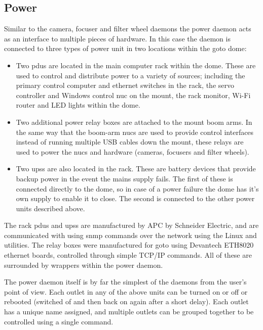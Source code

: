 \begin{colsection}
\begin{colsection}
\end{colsection}


\subsection{Power}
\label{sec:power}
\begin{colsection}

Similar to the camera, focuser and filter wheel daemons the power daemon acts as an interface to multiple pieces of hardware. In this case the daemon is connected to three types of power unit in two locations within the \gls{goto} dome:

\begin{itemize}
    \item Two \glspl{pdu} are located in the main computer rack within the dome. These are used to control and distribute power to a variety of sources; including the primary control computer and ethernet switches in the rack, the servo controller and Windows control \gls{nuc} on the mount, the rack monitor, Wi-Fi router and LED lights within the dome.
    \item Two additional power relay boxes are attached to the mount boom arms. In the same way that the boom-arm \glspl{nuc} are used to provide control interfaces instead of running multiple USB cables down the mount, these relays are used to power the \glspl{nuc} and hardware (cameras, focusers and filter wheels).
    \item Two \glspl{ups} are also located in the rack. These are battery devices that provide backup power in the event the mains supply fails. The first of these is connected directly to the dome, so in case of a power failure the dome has it's own supply to enable it to close. The second is connected to the other power units described above.
\end{itemize}

The rack \glspl{pdu} and \glspl{ups} are manufactured by APC by Schneider Electric, and are communicated with using \gls{snmp} commands over the network using the Linux  and  utilities. The relay boxes were manufactured for \gls{goto} using Devantech ETH8020 ethernet boards, controlled through simple TCP/IP commands. All of these are surrounded by  wrappers within the power daemon.

The power daemon itself is by far the simplest of the daemons from the user's point of view. Each outlet in any of the above units can be turned on or off or rebooted (switched of and then back on again after a short delay). Each outlet has a unique name assigned, and multiple outlets can be grouped together to be controlled using a single command.

\end{colsection}


\end{colsection}

